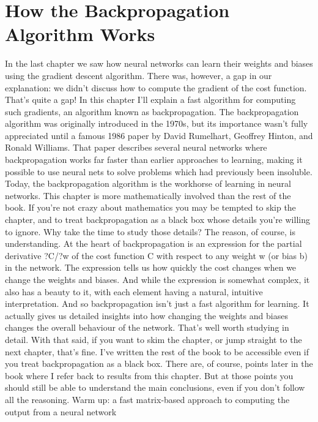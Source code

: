 
\chapter{How the Backpropagation Algorithm Works}


In the last chapter we saw how neural networks can learn their weights and biases using the gradient descent algorithm. There was, however, a gap in our explanation: we didn't discuss how to compute the gradient of the cost function. That's quite a gap! In this chapter I'll explain a fast algorithm for computing such gradients, an algorithm known as backpropagation. 
The backpropagation algorithm was originally introduced in the 1970s, but its importance wasn't fully appreciated until a famous 1986 paper by David Rumelhart, Geoffrey Hinton, and Ronald Williams. That paper describes several neural networks where backpropagation works far faster than earlier approaches to learning, making it possible to use neural nets to solve problems which had previously been insoluble. Today, the backpropagation algorithm is the workhorse of learning in neural networks.
This chapter is more mathematically involved than the rest of the book. If you're not crazy about mathematics you may be tempted to skip the chapter, and to treat backpropagation as a black box whose details you're willing to ignore. Why take the time to study those details?
The reason, of course, is understanding. At the heart of backpropagation is an expression for the partial derivative ?C/?w of the cost function C with respect to any weight w (or bias b) in the network. The expression tells us how quickly the cost changes when we change the weights and biases. And while the expression is somewhat complex, it also has a beauty to it, with each element having a natural, intuitive interpretation. And so backpropagation isn't just a fast algorithm for learning. It actually gives us detailed insights into how changing the weights and biases changes the overall behaviour of the network. That's well worth studying in detail.
With that said, if you want to skim the chapter, or jump straight to the next chapter, that's fine. I've written the rest of the book to be accessible even if you treat backpropagation as a black box. There are, of course, points later in the book where I refer back to results from this chapter. But at those points you should still be able to understand the main conclusions, even if you don't follow all the reasoning.
Warm up: a fast matrix-based approach to computing the output from a neural network
